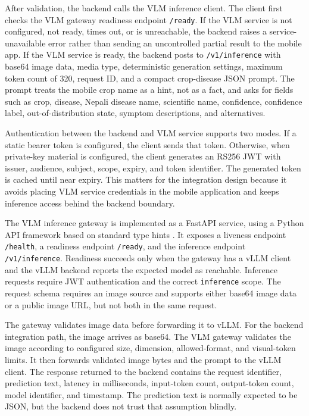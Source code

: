 After validation, the backend calls the VLM inference client. The client first checks the VLM
gateway readiness endpoint \texttt{/ready}. If the VLM service is not configured, not ready, times
out, or is unreachable, the backend raises a service-unavailable error rather than sending an
uncontrolled partial result to the mobile app. If the VLM service is ready, the backend posts to
\texttt{/v1/inference} with base64 image data, media type, deterministic generation settings,
maximum token count of 320, request ID, and a compact crop-disease JSON prompt. The prompt treats
the mobile crop name as a hint, not as a fact, and asks for fields such as crop, disease,
Nepali disease name, scientific name, confidence, confidence label, out-of-distribution state,
symptom descriptions, and alternatives.

Authentication between the backend and VLM service supports two modes. If a static bearer token is
configured, the client sends that token. Otherwise, when private-key material is configured, the
client generates an RS256 JWT with issuer, audience, subject, scope, expiry, and token identifier.
The generated token is cached until near expiry. This matters for the integration design because
it avoids placing VLM service credentials in the mobile application and keeps inference access
behind the backend boundary.


The VLM inference gateway is implemented as a FastAPI service, using a Python API framework based
on standard type hints \parencite{fastapiDocs}. It exposes a liveness endpoint
\texttt{/health}, a readiness endpoint \texttt{/ready}, and the inference endpoint
\texttt{/v1/inference}. Readiness succeeds only when the gateway has a vLLM client and the vLLM
backend reports the expected model as reachable. Inference requests require JWT authentication and
the correct \texttt{inference} scope. The request schema requires an image source and supports
either base64 image data or a public image URL, but not both in the same request.

The gateway validates image data before forwarding it to vLLM. For the backend integration path,
the image arrives as base64. The VLM gateway validates the image according to configured size,
dimension, allowed-format, and visual-token limits. It then forwards validated image bytes and the
prompt to the vLLM client. The response returned to the backend contains the request identifier,
prediction text, latency in milliseconds, input-token count, output-token count, model identifier,
and timestamp. The prediction text is normally expected to be JSON, but the backend does not trust
that assumption blindly.

